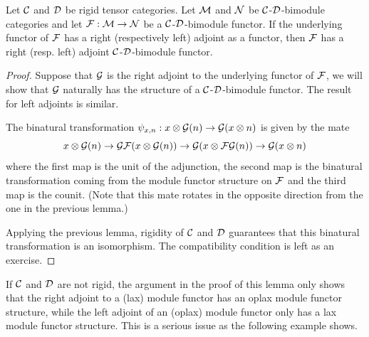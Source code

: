 \documentclass{amsart}
\begin{document}
\begin{lemma} \label{lma:module-adjoint}
Let $\mathcal C$ and $\mathcal D$ be rigid tensor categories. Let  $\mathcal M$ and  $\mathcal N$  be  $\mathcal C$-$\mathcal D$-bimodule categories and let $\mathcal F: \mathcal M \to \mathcal N$ be a $\mathcal C$-$\mathcal D$-bimodule functor.  If the underlying functor of $\mathcal F$ has a right (respectively left) adjoint as a functor, then $\mathcal F$ has a right (resp. left) adjoint $\mathcal C$-$\mathcal D$-bimodule functor. 
\end{lemma}
\begin{proof}
Suppose that $\mathcal G$ is the right adjoint to the underlying functor of $\mathcal F$, we will show that $\mathcal G$ naturally has the structure of a $\mathcal C$-$\mathcal D$-bimodule functor.  The result for left adjoints is similar.

The binatural transformation $\psi_{x,n}: x \otimes \mathcal G(n) \rightarrow \mathcal G(x \otimes n)$ is given by the mate
$$x \otimes \mathcal G(n) \rightarrow \mathcal G \mathcal F(x \otimes \mathcal G(n)) \rightarrow \mathcal G(x \otimes \mathcal F\mathcal G(n)) \rightarrow \mathcal G(x \otimes n)$$
where the first map is the unit of the adjunction, the second map is the binatural transformation coming from the module functor structure on $\mathcal F$ and the third map is the counit.  (Note that this mate rotates in the opposite direction from the one in the previous lemma.)


Applying the previous lemma, rigidity of $\mathcal C$ and $\mathcal D$ guarantees that this binatural transformation is an isomorphism.  The compatibility condition is left as an exercise.
\end{proof}

\begin{remark}
If $\mathcal C$ and $\mathcal D$ are not rigid, the argument in the proof of this lemma only shows that the right adjoint to a (lax) module functor has an oplax module functor structure, while the left adjoint of an (oplax) module functor only has a lax module functor structure.  This is a serious issue as the following example shows. 
\end{remark}
\end{document}

